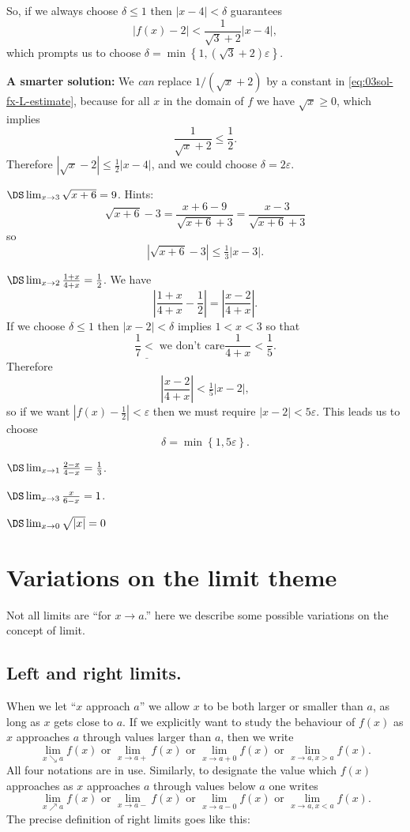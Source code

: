 \begin{multicols}{3}
So, if we always choose $\delta\leq 1$ then $|x-4|<\delta$ guarantees
\[
|f(x)-2| < \frac1{\sqrt3 +2}|x-4|,
\]
which prompts us to choose $\delta = \min\left\{ 1, (\sqrt
  3+2)\varepsilon \right\}$.

\textbf{A smarter solution:} We \emph{can} replace $1/(\sqrt x +2)$
by a constant in \eqref{eq:03sol-fx-L-estimate}, because for all $x$
in the domain of $f$ we have $\sqrt x \geq0$, which implies
\[
\frac1{\sqrt x+ 2} \leq \frac 12.
\]
Therefore $|\sqrt x- 2| \leq \frac12|x-4|$, and we could choose
$\delta = 2\varepsilon$.
\endanswer

\problem $\DS \lim_{x\to3}\sqrt{x+6} = 9$.
\answer
Hints:
\[
\sqrt{x+6}-3 = \frac{x+6-9}{\sqrt{x+6} + 3} = \frac{x-3}{\sqrt{x+6} +
  3}
\]
so
\[
|\sqrt{x+6} - 3|\leq \tfrac13 |x-3|.
\]
\endanswer

\problem $\DS \lim_{x\to 2}\frac{1+x}{4+x} = \tfrac12$.
\answer
We have
\[
\left|\frac{1+x}{4+x} - \frac{1}{2}\right| =
\left|\frac{x-2}{4+x}\right|.
\]
If we choose $\delta\le1$ then $|x-2|<\delta$ implies $1<x<3$ so that
\[
\underline{\frac17 <\;}{\text{we don't care}} \frac{1}{4+x} <
\frac15.
\]
Therefore
\[
\left|\frac{x-2}{4+x}\right| < \tfrac15 |x-2|,
\]
so if we want $|f(x) - \tfrac12| <\varepsilon$ then we must require
$|x-2|< 5\varepsilon$.  This leads us to choose
\[
\delta = \min\left\{ 1, 5\varepsilon \right\}.
\]
\endanswer

\problem $\DS \lim_{x\to 1}\frac{2-x}{4-x} = \tfrac13$.

\problem $\DS \lim_{x\to 3}\frac{x}{6-x} = 1$.

\problem \(\DS \lim_{x\to 0} \sqrt{|x|} = 0\)
\end{multicols}


\noproblemfont
\section{Variations on the limit theme}
\label{sec:variations-on-limit-theme}%
Not all limits are ``for $x\to a$.''  here we describe some possible
variations on the concept of limit.


\subsection{Left and right limits. }
When we let ``$x$ approach $a$'' we allow $x$ to be both larger or smaller
than $a$, as long as $x$ gets close to $a$.  If we explicitly want to study
the behaviour of $f(x)$ as $x$ approaches $a$ through values larger than
$a$, then we write
\[
\lim_{x\searrow a} f(x)\text{ or } \lim_{x\to a+} f(x) \text{ or }
\lim_{x\to a+0} f(x) \text{ or } \lim_{x\to a, x>a} f(x).
\]
All four notations are in use.  Similarly, to designate the value which
$f(x)$ approaches as $x$ approaches $a$ through values below $a$ one writes
\[
\lim_{x\nearrow a} f(x)\text{ or } \lim_{x\to a-} f(x) \text{ or }
\lim_{x\to a-0} f(x) \text{ or } \lim_{x\to a, x<a} f(x).
\]
The precise definition of right limits goes like this:

